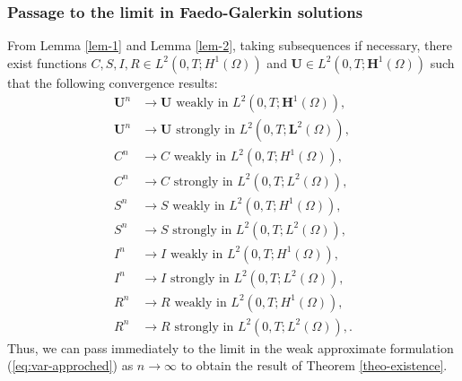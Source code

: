 \documentclass[10pt,number,preprint,times]{elsarticle}
\numberwithin{equation}{section} %
\begin{document}
	\subsubsection{Passage to the limit in Faedo-Galerkin solutions}
	From Lemma \ref{lem-1} and Lemma \ref{lem-2}, taking subsequences if necessary,  there exist functions $C, S, I,R \in L^2(0,T; H^1(\Omega))$ and $\boldsymbol{U} \in L^2(0,T; \boldsymbol{H}^1(\Omega))$ such that the following convergence results:
	\begin{equation}\label{limit1}
	\begin{split} 
		\boldsymbol{U}^n &\to \boldsymbol{U}\text{ weakly in }L^2(0,T; \boldsymbol{H}^1(\Omega)), \\
		\boldsymbol{U}^n &\to \boldsymbol{U}\text{ strongly in }L^2(0,T; \boldsymbol{L}^2(\Omega)),\\
		 C^n &\to C \text{ weakly in }L^2(0,T; H^1(\Omega)), \\
		 C^n &\to C\text{ strongly in }L^2(0,T; L^2(\Omega)), \\
		 S^n &\to S\text{ weakly in }L^2(0,T; H^1(\Omega)), \\
	    S^n &\to S\text{ strongly in }L^2(0,T; L^2(\Omega)),\\
	    I^n &\to I\text{ weakly in }L^2(0,T; H^1(\Omega)), \\
	    I^n &\to I\text{ strongly in }L^2(0,T; L^2(\Omega)),\\
	    R^n &\to R\text{ weakly in }L^2(0,T; H^1(\Omega)), \\
	    R^n &\to R\text{ strongly in }L^2(0,T; L^2(\Omega)),
	    .
	\end{split}
\end{equation}
Thus, we can pass immediately to the limit in the weak approximate formulation (\ref{eq:var-approched}) as $n\longrightarrow \infty$ to obtain the result of Theorem \ref{theo-existence}.
\end{document}
